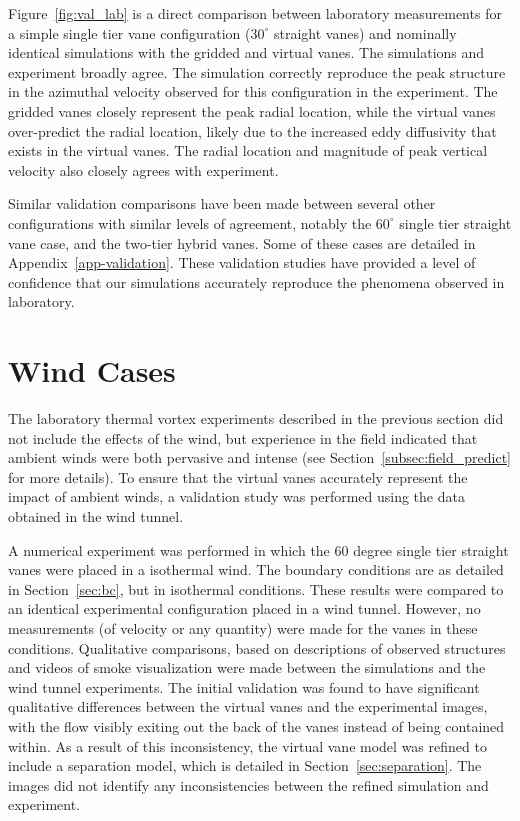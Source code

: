 Figure~\ref{fig:val_lab} is a direct comparison
between laboratory measurements for a simple single tier vane
configuration ($30^{\circ}$ straight vanes) and nominally identical
simulations with the gridded and 
virtual vanes. The simulations and experiment broadly agree. The
simulation correctly reproduce the peak structure in the azimuthal
velocity observed for this configuration in the experiment. The gridded
vanes closely represent the peak radial location, while the
virtual vanes over-predict the radial location, likely due to the
increased eddy diffusivity that exists in the virtual vanes. The radial
location and magnitude of peak vertical velocity also closely agrees
with experiment. 

Similar validation comparisons have been made between several other
configurations with similar levels of agreement,  notably the
$60^{\circ}$ single tier straight vane case, and the two-tier hybrid
vanes. Some of these cases are detailed in Appendix~\ref{app-validation}.
These validation studies have provided a level of confidence that our
simulations accurately reproduce the phenomena observed in laboratory.


\section{Wind Cases}

The laboratory thermal vortex experiments described in the previous
section did not include the effects of the wind, but experience in
the field indicated that ambient winds were both pervasive and intense
(see Section~\ref{subsec:field_predict} for more details). To ensure that
the virtual vanes accurately represent the impact of ambient winds, a
validation study was performed using the data obtained in the wind
tunnel. 

A numerical experiment was performed in which the 60 degree single tier
straight vanes were placed in a isothermal wind. The boundary conditions
are as detailed in Section~\ref{sec:bc}, but in isothermal
conditions. These results were compared to an identical experimental
configuration placed in a wind tunnel. However, no measurements (of
velocity or any quantity) were made for the vanes in these
conditions. Qualitative comparisons, based on descriptions of observed
structures and videos of smoke visualization were made between the
simulations and the wind tunnel experiments. The initial validation was
found to have significant qualitative differences between the virtual
vanes and the experimental images, with the flow visibly exiting out the
back of the vanes instead of being contained within.  As a result of
this inconsistency, the virtual vane model was refined to include a
separation model, which is detailed in Section~\ref{sec:separation}. The
images  did not identify any inconsistencies between the refined
simulation and experiment.   

